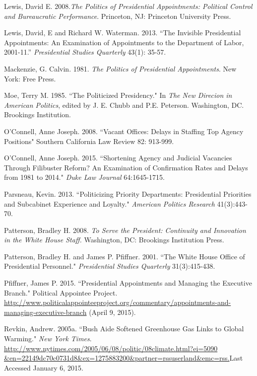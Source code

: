 \documentclass[12pt]{article}
\begin{document}
\noindent \hangindent=0.7cm Lewis, David E. 2008.\textit{The Politics of Presidential Appointments: Political Control and Bureaucratic Performance}. Princeton, NJ: Princeton University Press. 

\noindent \hangindent=0.7cm Lewis, David, E and Richard W. Waterman. 2013. ``The Invisible Presidential Appointments: An Examination of Appointments to the Department of Labor, 2001-11.'' \textit{Presidential Studies Quarterly} 43(1): 35-57.

\noindent \hangindent=0.7cm Mackenzie, G. Calvin. 1981. \textit{The Politics of Presidential Appointments}. New York: Free Press. 

\noindent \hangindent=0.7cm  Moe, Terry M. 1985. ``The Politicized Presidency." In \textit{The New Direcion in American Politics}, edited by J. E. Chubb and P.E. Peterson. Washington, DC. Brookings Institution. 

\noindent \hangindent=0.7cm O'Connell, Anne Joseph. 2008. ``Vacant Offices: Delays in Staffing Top Agency Positions" Southern California Law Review 82: 913-999.

\noindent \hangindent=0.7cm O'Connell, Anne Joseph. 2015. ``Shortening Agency and Judicial Vacancies Through Filibuster Reform? An Examination of Confirmation Rates and Delays from 1981 to 2014." \textit{Duke Law Journal} 64:1645-1715.

\noindent \hangindent=0.7cm Parsneau, Kevin. 2013. ``Politicizing Priority Departments: Presidential Priorities and Subcabinet Experience and Loyalty." \textit{American Politics Research} 41(3):443-70.

\noindent \hangindent=0.7cm Patterson, Bradley H. 2008. \textit{To Serve the President: Continuity and Innovation in the White House Staff.} Washington, DC: Brookings Institution Press.

\noindent \hangindent=0.7cm Patterson, Bradley H. and James P. Pfiffner. 2001. ``The White House Office of Presidential Personnel." \textit{Presidential Studies Quarterly} 31(3):415-438.

\noindent \hangindent=0.7cm Pfiffner, James P. 2015. ``Presidential Appointments and Managing the Executive Branch." Political Appointee Project. \url{http://www.politicalappointeeproject.org/commentary/appointments-and-managing-executive-branch} (April 9, 2015).

\noindent \hangindent=0.7cm Revkin, Andrew. 2005a. ``Bush Aide Softened Greenhouse Gas Links to Global Warming." \textit{New York Times}. \url{http://www.nytimes.com/2005/06/08/politic/08climate.html?ei=5090 &en=22149dc70c0731d8&ex=1275883200&partner=rssuserland&emc=rss.}Last Accessed January 6, 2015.
\end{document}
